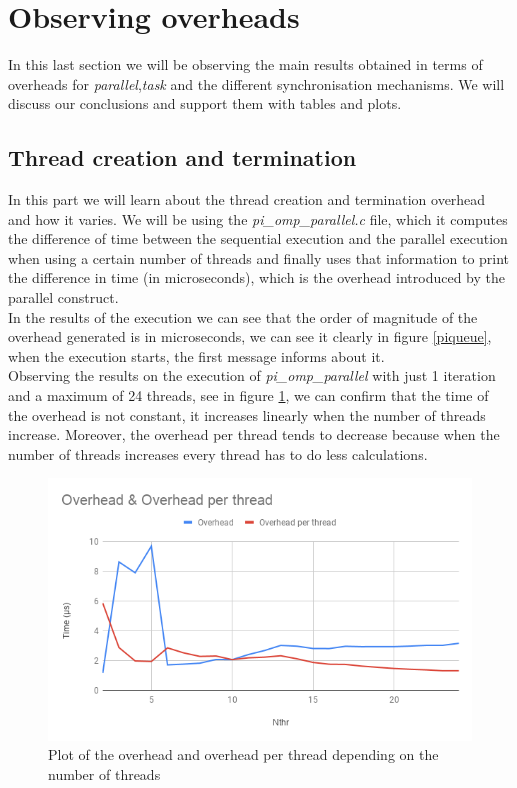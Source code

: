 \documentclass[12]{article}
\begin{document}
\section{Observing overheads}
In this last section we will be observing the main results obtained in terms of overheads for \textit{parallel},\textit{task} and the different synchronisation mechanisms. We will discuss our conclusions and support them with tables and plots.

\subsection{Thread creation and termination}
In this part we will learn about the thread creation and termination overhead and how it varies. We will be using the \textit{pi\_omp\_parallel.c} file, which it computes the difference of time between the sequential execution and the parallel execution when using a certain number of threads and finally uses that information to print the difference in time (in microseconds), which is the overhead introduced by the parallel construct. 
\\
\medskip
In the results of the execution we can see that the order of magnitude of the overhead generated is in microseconds, we can see it clearly in figure \ref{piqueue}, when the execution starts, the first message informs about it. 
\\
Observing the results on the execution of \textit{pi\_omp\_parallel} with just 1 iteration and a maximum of 24 threads, see in figure \ref{overheadplot1}, we can confirm that the time of the overhead is not constant, it increases linearly when the number of threads increase. Moreover, the overhead per thread tends to decrease because when the number of threads increases every thread has to do less calculations.

\begin{figure}[H]
\centering
\includegraphics[scale=0.5]{images/thread.png}
\caption{Plot of the overhead and overhead per thread depending on the number of threads}
\label{overheadplot1}
\end{figure}
\end{document}
